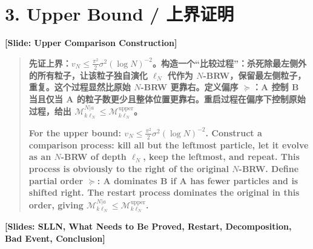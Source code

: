 \documentclass[12pt,a4paper]{article}
\begin{document}
\section*{3. Upper Bound / 上界证明}

\begin{center}
\color{blue!60!black}\textbf{[Slide: Upper Comparison Construction]}
\end{center}

\begin{quote}
\textbf{先证上界：$v_N\le\frac{\pi^2}{2}\sigma^2(\log N)^{-2}$。构造一个``比较过程''：杀死除最左侧外的所有粒子，让该粒子独自演化 $\ell_N$ 代作为 $N$-BRW，保留最左侧粒子，重复。这个过程显然比原始 $N$-BRW 更靠右。定义偏序 $\succcurlyeq$：A 控制 B 当且仅当 A 的粒子数更少且整体位置更靠右。重启过程在偏序下控制原始过程，给出 $\mathcal M_{k\ell_N}^{N|a}\le\mathcal M_{k\ell_N}^{\mathrm{upper}}$。}

\bigskip

\textbf{For the upper bound: $v_N\le\frac{\pi^2}{2}\sigma^2(\log N)^{-2}$. Construct a comparison process: kill all but the leftmost particle, let it evolve as an $N$-BRW of depth $\ell_N$, keep the leftmost, and repeat. This process is obviously to the right of the original $N$-BRW. Define partial order $\succcurlyeq$: A dominates B if A has fewer particles and is shifted right. The restart process dominates the original in this order, giving $\mathcal M_{k\ell_N}^{N|a}\le\mathcal M_{k\ell_N}^{\mathrm{upper}}$.}
\end{quote}

\begin{center}
\color{blue!60!black}\textbf{[Slides: SLLN, What Needs to Be Proved, Restart, Decomposition, Bad Event, Conclusion]}
\end{center}
\end{document}
